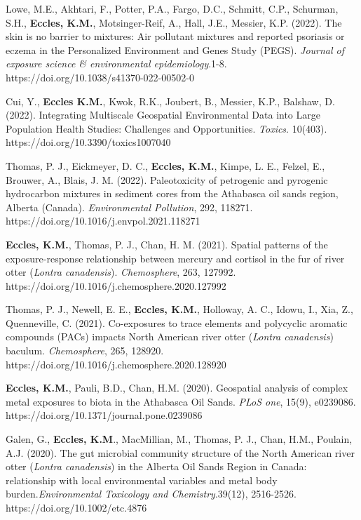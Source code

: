 \documentclass[margin,line]{res}
\begin{document}
\begin{resume}
\begin{etaremune}[start=25]
\item Lowe, M.E., Akhtari, F., Potter, P.A., Fargo, D.C., Schmitt, C.P., Schurman, S.H., \textbf{Eccles, K.M.}, Motsinger-Reif, A., Hall, J.E., Messier, K.P. (2022). The skin is no barrier to mixtures: Air pollutant mixtures and reported
psoriasis or eczema in the Personalized Environment and Genes Study (PEGS). \textit{Journal of exposure science \& environmental epidemiology}.1-8. https://doi.org/10.1038/s41370-022-00502-0

\item Cui, Y., \textbf{Eccles K.M.}, Kwok, R.K., Joubert, B., Messier, K.P., Balshaw, D. (2022). Integrating Multiscale Geospatial Environmental Data into Large Population Health Studies: Challenges and Opportunities. \textit{Toxics}. 10(403). https://doi.org/10.3390/toxics1007040

\item Thomas, P. J., Eickmeyer, D. C., \textbf{Eccles, K.M.}, Kimpe, L. E., Felzel, E., Brouwer, A., Blais, J. M. (2022). Paleotoxicity of petrogenic and pyrogenic hydrocarbon mixtures in sediment cores from the Athabasca oil sands region, Alberta (Canada). \textit{Environmental Pollution}, 292, 118271. \\
https://doi.org/10.1016/j.envpol.2021.118271

\item \textbf{Eccles, K.M.}, Thomas, P. J., Chan, H. M. (2021). Spatial patterns of the exposure-response relationship between mercury and cortisol in the fur of river otter (\textit{Lontra canadensis}). \textit{Chemosphere}, 263, 127992. https://doi.org/10.1016/j.chemosphere.2020.127992

\item Thomas, P. J., Newell, E. E., \textbf{Eccles, K.M.}, Holloway, A. C., Idowu, I., Xia, Z., Quenneville, C. (2021). Co-exposures to trace elements and polycyclic aromatic compounds (PACs) impacts North American river otter (\textit{Lontra canadensis}) baculum. \textit{Chemosphere}, 265, 128920.\\https://doi.org/10.1016/j.chemosphere.2020.128920

\item \textbf{Eccles, K.M.}, Pauli, B.D., Chan, H.M. (2020). Geospatial analysis of complex metal exposures to biota in the Athabasca Oil Sands. \textit{PLoS one}, 15(9), e0239086. \\https://doi.org/10.1371/journal.pone.0239086

\item Galen, G., \textbf{Eccles, K.M}., MacMillian, M., Thomas, P. J., Chan, H.M., Poulain, A.J. (2020). The gut microbial community structure of the North American river otter (\textit{Lontra canadensis}) in the Alberta Oil Sands Region in Canada: relationship with local environmental variables and metal body burden.\textit{Environmental Toxicology and Chemistry}.39(12), 2516-2526. https://doi.org/10.1002/etc.4876


\end{etaremune}
\end{resume}
\end{document}
